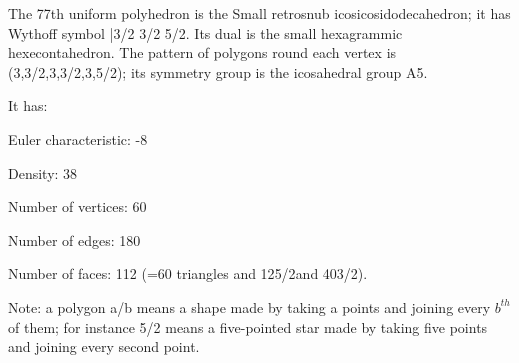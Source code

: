 The 77th uniform polyhedron is the Small retrosnub icosicosidodecahedron; it has Wythoff symbol |3/2 3/2 5/2. Its dual is the small hexagrammic hexecontahedron. The pattern of polygons round each vertex is (3,3/2,3,3/2,3,5/2); its symmetry group is the icosahedral group A5.\par
It has:\par
Euler characteristic: -8\par
Density: 38\par
Number of vertices: 60\par
Number of edges:  180\par
Number of faces: 112 (=60 triangles and 12{5/2}and 40{3/2}).\par
Note: a polygon a/b means a shape made by taking a points and joining every $b^{th}$  of them; for instance 5/2 means a five-pointed star made by taking five points and joining every second point.